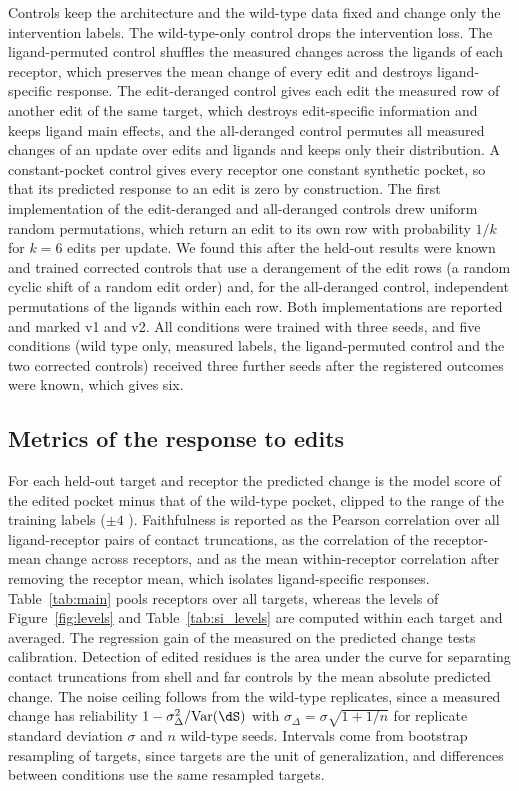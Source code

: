 Controls keep the architecture and the wild-type data fixed and change only the intervention labels. The wild-type-only control drops the intervention loss. The ligand-permuted control shuffles the measured changes across the ligands of each receptor, which preserves the mean change of every edit and destroys ligand-specific response. The edit-deranged control gives each edit the measured row of another edit of the same target, which destroys edit-specific information and keeps ligand main effects, and the all-deranged control permutes all measured changes of an update over edits and ligands and keeps only their distribution. A constant-pocket control gives every receptor one constant synthetic pocket, so that its predicted response to an edit is zero by construction. The first implementation of the edit-deranged and all-deranged controls drew uniform random permutations, which return an edit to its own row with probability $1/k$ for $k = 6$ edits per update. We found this after the held-out results were known and trained corrected controls that use a derangement of the edit rows (a random cyclic shift of a random edit order) and, for the all-deranged control, independent permutations of the ligands within each row. Both implementations are reported and marked v1 and v2. All conditions were trained with three seeds, and five conditions (wild type only, measured labels, the ligand-permuted control and the two corrected controls) received three further seeds after the registered outcomes were known, which gives six.

\subsection{Metrics of the response to edits}

For each held-out target and receptor the predicted change is the model score of the edited pocket minus that of the wild-type pocket, clipped to the range of the training labels ($\pm 4$ \kcal{}). Faithfulness is reported as the Pearson correlation over all ligand-receptor pairs of contact truncations, as the correlation of the receptor-mean change across receptors, and as the mean within-receptor correlation after removing the receptor mean, which isolates ligand-specific responses. Table~\ref{tab:main} pools receptors over all targets, whereas the levels of Figure~\ref{fig:levels} and Table~\ref{tab:si_levels} are computed within each target and averaged. The regression gain of the measured on the predicted change tests calibration. Detection of edited residues is the area under the curve for separating contact truncations from shell and far controls by the mean absolute predicted change. The noise ceiling follows from the wild-type replicates, since a measured change has reliability $1 - \sigma_\Delta^2 / \mathrm{Var}(\dS)$ with $\sigma_\Delta = \sigma \sqrt{1 + 1/n}$ for replicate standard deviation $\sigma$ and $n$ wild-type seeds. Intervals come from bootstrap resampling of targets, since targets are the unit of generalization, and differences between conditions use the same resampled targets.

